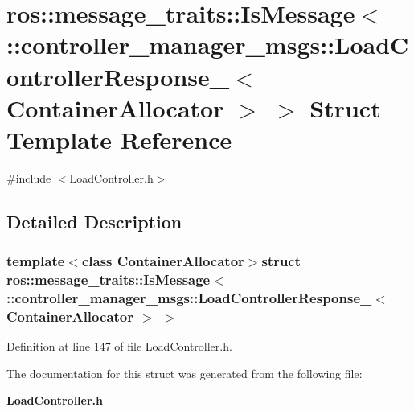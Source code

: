 \section{ros\-:\-:message\-\_\-traits\-:\-:\-Is\-Message$<$ \-:\-:controller\-\_\-manager\-\_\-msgs\-:\-:\-Load\-Controller\-Response\-\_\-$<$ \-Container\-Allocator $>$ $>$ \-Struct \-Template \-Reference}
\label{structros_1_1message__traits_1_1IsMessage_3_01_1_1controller__manager__msgs_1_1LoadControllerRes0233367f075598ce1f72d33ff61506d4}


{\ttfamily \#include $<$\-Load\-Controller.\-h$>$}



\subsection{\-Detailed \-Description}
\subsubsection*{template$<$class Container\-Allocator$>$struct ros\-::message\-\_\-traits\-::\-Is\-Message$<$ \-::controller\-\_\-manager\-\_\-msgs\-::\-Load\-Controller\-Response\-\_\-$<$ Container\-Allocator $>$ $>$}



\-Definition at line 147 of file \-Load\-Controller.\-h.



\-The documentation for this struct was generated from the following file\-:\begin{DoxyCompactItemize}
\item 
{\bf \-Load\-Controller.\-h}\end{DoxyCompactItemize}
